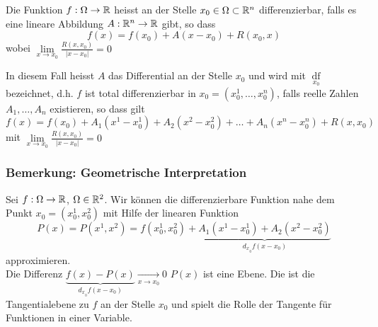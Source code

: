 \begin{definition}{8.4}
Die Funktion $f:\Omega\to\mathbb{R}$ heisst an der Stelle $x_0\in\Omega\subset\mathbb{R}^n$ differenzierbar, falls es eine lineare Abbildung $A:\mathbb{R}^n\to\mathbb{R}$ gibt, so dass \[f(x) = f\left( {{x_0}} \right) + A\left( {x - {x_0}} \right) + R\left( {{x_0},x} \right)\] wobei $\mathop {\lim }\limits_{x \to {x_0}} \frac{{R\left( {x,{x_0}} \right)}}{{\left| {x - {x_0}} \right|}} = 0$
\end{definition}
In diesem Fall heisst $A$ das Differential an der Stelle $x_0$ und wird mit $\mathop {df}\limits_{{x_0}} $ bezeichnet, d.h. $f$ ist total differenzierbar in $x_0=\left( x_0^1,\dots,x_0^n\right)$, falls reelle Zahlen $A_1,\dots,A_n$ existieren, so dass gilt \[f(x) = f\left( {{x_0}} \right) + {A_1}\left( {{x^1} - x_0^1} \right) + {A_2}\left( {{x^2} - x_0^2} \right) +  \ldots  + {A_n}\left( {{x^n} - x_0^n} \right) + R\left( {x,{x_0}} \right)\] mit $\mathop {\lim }\limits_{x \to {x_0}} \frac{{R\left( {x,{x_0}} \right)}}{{\left| {x - {x_0}} \right|}} = 0$

\subsubsection*{Bemerkung: Geometrische Interpretation}
Sei $f:\Omega \to\mathbb{R}$, $\Omega\in\mathbb{R}^2$. Wir können die differenzierbare Funktion nahe dem Punkt $x_0=\left( x_0^1,x_0^2\right)$ mit Hilfe der linearen Funktion \[P\left( x \right) = P\left( {{x^1},{x^2}} \right) = f\left( {x_0^1,x_0^2} \right) + \underbrace {{A_1}\left( {{x^1} - x_0^1} \right) + {A_2}\left( {{x^2} - x_0^2} \right)}_{{d_x}_{_0}f\left( {x - {x_0}} \right)}\] approximieren. \\

Die Differenz $\underbrace {f(x) - P(x)}_{{d_x}_{_0}f\left( {x - {x_0}} \right)}\mathop  \to \limits_{x \to {x_0}} 0$ $P(x)$ ist eine Ebene. Die ist die Tangentialebene zu $f$ an der Stelle $x_0$ und spielt die Rolle der Tangente für Funktionen in einer Variable. 

